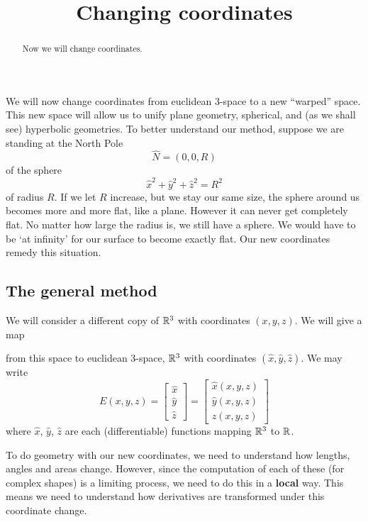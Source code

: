 \documentclass[newpage,hints,handout,12pt,noauthor,nooutcomes]{ximera}
\title{Changing coordinates}
\begin{document}
\begin{abstract}
Now we will change coordinates.
\end{abstract}
\maketitle




We will now change coordinates from euclidean $3$-space to a new
``warped'' space.  This new space will allow us to unify plane
geometry, spherical, and (as we shall see) hyperbolic geometries. To
better understand our method, suppose we are standing at the North Pole%
\[
\hat{N}=(0,0,R)
\]
of the sphere%
\[
\hat{x}^{2}+\hat{y}^{2}+\hat{z}^{2}=R^{2} %
\]
of radius $R$. If we let $R$ increase, but we stay our same size, the
sphere around us becomes more and more flat, like a plane. However it
can never get completely flat. No matter how large the radius is, we
still have a sphere.  We would have to be `at infinity' for our
surface to become exactly flat. Our new coordinates remedy this
situation.


\subsection{The general method}


We will consider a different copy of $\mathbb R^3$ with coordinates
$(x,y,z)$. We will give a map
\begin{center}
\end{center}
from this space to euclidean 3-space, $\mathbb R^3$ with coordinates $(\hat
x,\hat y,\hat z)$. We may write
\[
E(x,y,z) = 
\begin{bmatrix}
\hat{x}  \\
\hat{y}  \\
\hat{z}  
\end{bmatrix}
=
\begin{bmatrix}
\hat{x}(x,y,z)  \\
\hat{y}(x,y,z)  \\
\hat{z}(x,y,z)  
\end{bmatrix}
\]
where $\hat x$, $\hat y$, $\hat z$ are each (differentiable) functions mapping
$\mathbb R^3$ to $\mathbb R$.


To do geometry with our new coordinates, we need to understand how
lengths, angles and areas change. However, since the computation of
each of these (for complex shapes) is a limiting process, we need to
do this in a \textbf{local} way. This means we need to understand how
derivatives are transformed under this coordinate change.
\end{document}
